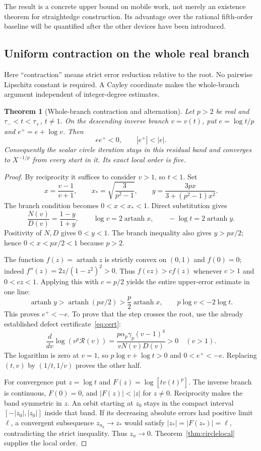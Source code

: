 \documentclass[11pt,a4paper]{article}
\newtheorem{theorem}{Theorem}[section]\newtheorem{proposition}[theorem]{Proposition}
\DeclareMathOperator{\artanh}{artanh}
\begin{document}
The result is a concrete upper bound on mobile work, not merely an existence theorem for straightedge construction. Its advantage over the rational fifth-order baseline will be quantified after the other devices have been introduced.

\clearpage
\subsection{Uniform contraction on the whole real branch}\label{sec:branch}
Here ``contraction'' means strict error reduction relative to the root. No pairwise Lipschitz constant is required. A Cayley coordinate makes the whole-branch argument independent of integer-degree estimates.

\begin{theorem}[Whole-branch contraction and alternation]\label{thm:branch}
Let $p>2$ be real and $\tau_-<t<\tau_+$, $t\ne1$. On the descending inverse branch $v=v(t)$, put $e=\log t/p$ and $e^+=e+\log v$. Then
\[
 ee^+<0,\qquad |e^+|<|e|.
\]
Consequently the scalar circle iteration stays in this residual band and converges to $X^{-1/p}$ from every start in it. Its exact local order is five.
\end{theorem}
\begin{proof}
By reciprocity it suffices to consider $v>1$, so $t<1$. Set
\[
 x=\frac{v-1}{v+1},\qquad x_* =\sqrt{\frac{3}{p^2-1}},\qquad
 y=\frac{3px}{3+(p^2-1)x^2}.
\]
The branch condition becomes $0<x<x_*<1$. Direct substitution gives
\begin{equation}\label{eq:cayleybranch}
 \frac{N(v)}{D(v)}=\frac{1-y}{1+y},\qquad
 \log v=2\artanh x,\qquad -\log t=2\artanh y.
\end{equation}
Positivity of $N,D$ gives $0<y<1$. The branch inequality also gives $y>px/2$; hence $0<x<px/2<1$ because $p>2$.

The function $f(z)=\artanh z$ is strictly convex on $(0,1)$ and $f(0)=0$; indeed $f''(z)=2z/(1-z^2)^2>0$. Thus $f(cz)>cf(z)$ whenever $c>1$ and $0<cz<1$. Applying this with $c=p/2$ yields the entire upper-error estimate in one line:
\begin{equation}\label{eq:convexity}
 \artanh y>\artanh(px/2)>\frac p2\artanh x,
 \qquad p\log v< -2\log t.
\end{equation}
This proves $e^+<-e$. To prove that the step crosses the root, use the already established defect certificate~\eqref{eq:cert}:
\[
 \frac{d}{dv}\log\!\left(v^p\mathcal R(v)\right)
 =\frac{p\alpha_p\gamma_p(v-1)^4}{vN(v)D(v)}>0\quad(v>1).
\]
The logarithm is zero at $v=1$, so $p\log v+\log t>0$ and $0<e^+<-e$. Replacing $(t,v)$ by $(1/t,1/v)$ proves the other half.

For convergence put $z=\log t$ and $F(z)=\log[tv(t)^p]$. The inverse branch is continuous, $F(0)=0$, and $|F(z)|<|z|$ for $z\ne0$. Reciprocity makes the band symmetric in $z$. An orbit starting at $z_0$ stays in the compact interval $[-|z_0|,|z_0|]$ inside that band. If its decreasing absolute errors had positive limit $\ell$, a convergent subsequence $z_{n_k}\to z_*$ would satisfy $|z_*|=|F(z_*)|=\ell$, contradicting the strict inequality. Thus $z_n\to0$. Theorem~\ref{thm:circlelocal} supplies the local order.
\end{proof}
\end{document}
